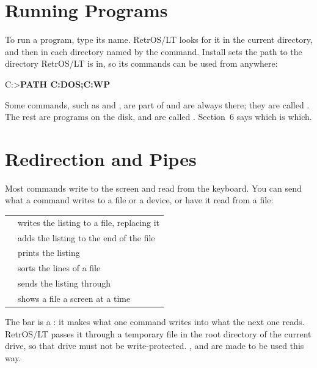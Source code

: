 
\section{Running Programs}

To run a program, type its name. RetrOS/LT looks for it in the current
directory, and then in each directory named by the  command.
Install sets the path to the directory RetrOS/LT is in, so its commands
can be used from anywhere:

\begin{dialogue}
C:\bs>\textbf{PATH C:\bs{}DOS;C:\bs{}WP}
\end{dialogue}

Some commands, such as  and , are part of
 and are always there; they are called .
The rest are programs on the disk, and are called .
Section~6 says which is which.

\section{Redirection and Pipes}

Most commands write to the screen and read from the keyboard. You can send
what a command writes to a file or a device, or have it read from a file:

\begin{tabularx}{\textwidth}{@{}P{2.2in}X@{}}
\toprule
{} & writes the listing to a file, replacing it\\
 & adds the listing to the end of the file\\
 & prints the listing\\
 & sorts the lines of a file\\
 & sends the listing through \\
 & shows a file a screen at a time\\
\bottomrule
\end{tabularx}

The bar \typed{|} is a : it makes what one command writes into
what the next one reads. RetrOS/LT passes it through a temporary file in
the root directory of the current drive, so that drive must not be
write-protected. ,  and  are made to be
used this way.

